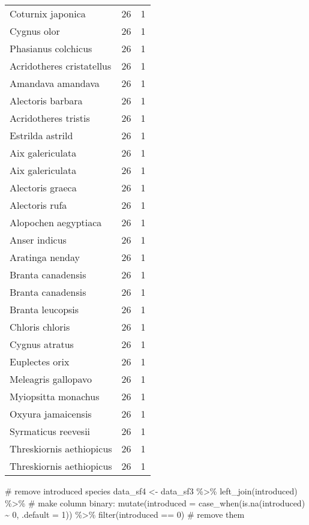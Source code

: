 \documentclass[
  letterpaper,
  DIV=11,
  numbers=noendperiod]{scrreprt}
\newenvironment{Shaded}{\begin{snugshade}}{\end{snugshade}}
\newcommand{\AttributeTok}[1]{\textcolor[rgb]{0.40,0.45,0.13}{#1}}
\newcommand{\CommentTok}[1]{\textcolor[rgb]{0.37,0.37,0.37}{#1}}
\newcommand{\DecValTok}[1]{\textcolor[rgb]{0.68,0.00,0.00}{#1}}
\newcommand{\FunctionTok}[1]{\textcolor[rgb]{0.28,0.35,0.67}{#1}}
\newcommand{\NormalTok}[1]{\textcolor[rgb]{0.00,0.23,0.31}{#1}}
\newcommand{\OtherTok}[1]{\textcolor[rgb]{0.00,0.23,0.31}{#1}}
\newcommand{\SpecialCharTok}[1]{\textcolor[rgb]{0.37,0.37,0.37}{#1}}
\begin{document}
\begin{longtable}[]{@{}lrr@{}}
Coturnix japonica & 26 & 1 \\
Cygnus olor & 26 & 1 \\
Phasianus colchicus & 26 & 1 \\
Acridotheres cristatellus & 26 & 1 \\
Amandava amandava & 26 & 1 \\
Alectoris barbara & 26 & 1 \\
Acridotheres tristis & 26 & 1 \\
Estrilda astrild & 26 & 1 \\
Aix galericulata & 26 & 1 \\
Aix galericulata & 26 & 1 \\
Alectoris graeca & 26 & 1 \\
Alectoris rufa & 26 & 1 \\
Alopochen aegyptiaca & 26 & 1 \\
Anser indicus & 26 & 1 \\
Aratinga nenday & 26 & 1 \\
Branta canadensis & 26 & 1 \\
Branta canadensis & 26 & 1 \\
Branta leucopsis & 26 & 1 \\
Chloris chloris & 26 & 1 \\
Cygnus atratus & 26 & 1 \\
Euplectes orix & 26 & 1 \\
Meleagris gallopavo & 26 & 1 \\
Myiopsitta monachus & 26 & 1 \\
Oxyura jamaicensis & 26 & 1 \\
Syrmaticus reevesii & 26 & 1 \\
Threskiornis aethiopicus & 26 & 1 \\
Threskiornis aethiopicus & 26 & 1 \\
\end{longtable}

\begin{Shaded}
\begin{Highlighting}[]
\CommentTok{\# remove introduced species}
\NormalTok{data\_sf4 }\OtherTok{\textless{}{-}}\NormalTok{ data\_sf3 }\SpecialCharTok{\%\textgreater{}\%}
  \FunctionTok{left\_join}\NormalTok{(introduced) }\SpecialCharTok{\%\textgreater{}\%}
  \CommentTok{\# make column binary:}
  \FunctionTok{mutate}\NormalTok{(}\AttributeTok{introduced =} \FunctionTok{case\_when}\NormalTok{(}\FunctionTok{is.na}\NormalTok{(introduced) }\SpecialCharTok{\textasciitilde{}} \DecValTok{0}\NormalTok{, }\AttributeTok{.default =} \DecValTok{1}\NormalTok{)) }\SpecialCharTok{\%\textgreater{}\%}
  \FunctionTok{filter}\NormalTok{(introduced }\SpecialCharTok{==} \DecValTok{0}\NormalTok{) }\CommentTok{\# remove them}
\end{Highlighting}
\end{Shaded}
\end{document}
